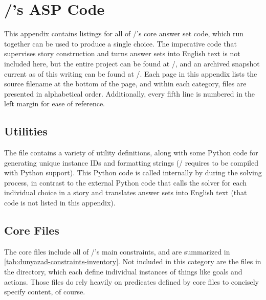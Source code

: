 \chapter{\dunyazad/'s ASP Code}
\pagestyle{listing}
\label{ap:src}%

This appendix contains listings for all of \dunyazad/'s core answer set code, which run together can be used to produce a single choice.
%
The imperative code that supervises story construction and turns answer sets into English text is not included here, but the entire project can be found at \githuburl/, and an archived snapshot current as of this writing can be found at \archiveurl/.
%
Each page in this appendix lists the source filename at the bottom of the page, and within each category, files are presented in alphabetical order.
%
Additionally, every fifth line is numbered in the left margin for ease of reference.

\section{Utilities}

The  file contains a variety of utility definitions, along with some Python code for generating unique instance IDs and formatting strings (\dunyazad/ requires  to be compiled with Python support).
%
This Python code is called internally by  during the solving process, in contrast to the external Python code that calls the solver for each individual choice in a story and translates answer sets into English text (that code is not listed in this appendix).


\section{Core Files}
\label{sec:src-core}

The core files include all of \dunyazad/'s main constraints, and are summarized in \cref{tab:dunyazad-constraints-inventory}.
%
Not included in this category are the files in the  directory, which each define individual instances of things like goals and actions.
%
Those files do rely heavily on predicates defined by core files to concisely specify content, of course.

